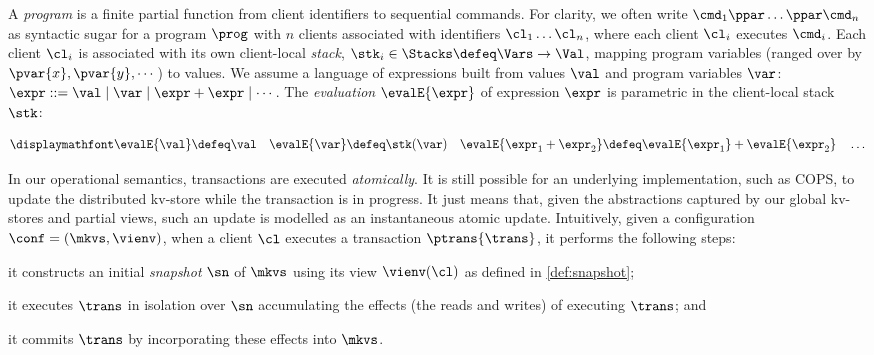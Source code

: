 A {\em program} is a finite partial function from client identifiers to sequential
commands.
For clarity, we often write \( \cmd_{1}\ppar \dots \ppar \cmd_{n}\) as syntactic sugar 
for a program \( \prog \) with $n$ clients associated with identifiers
$\cl_1 \dots \cl_n$, where each client $\cl_i$ executes
$\cmd_i$. 
Each client $\cl_i$ is associated with its own client-local  \emph{stack}, 
$\stk_i \in \Stacks \defeq \Vars \to \Val$,  mapping program variables
(ranged over by $\pvar{x}, \pvar{y}, \cdots$)
to values. 
We assume a language of expressions built from values \( \val \)
and program variables \( \var \):
$\expr ::= \val \mid \var \mid \expr + \expr \mid \cdots$.
The \emph{evaluation} $\evalE{\expr}$ of expression $\expr$ is parametric in
the client-local stack \( \stk \):%

\vspace{-5pt}
{%
\[
\displaymathfont
\begin{gathered}
\evalE{\val} \defeq
\val
\quad
\evalE{\var} \defeq
\stk(\var)
\quad
\evalE{\expr_{1} + \expr_{2}} \defeq
\evalE{\expr_{1}} + \evalE{\expr_{2}}
\quad
\dots
\end{gathered}%
\]
}%

   In our operational semantics, transactions are executed
\emph{atomically}. It is still possible for an underlying
implementation, such as COPS, to update the distributed kv-store while
the transaction is in progress. It just means that, given the
abstractions captured by our global kv-stores and partial views, 
such an update is modelled as  an instantaneous  atomic
update.
Intuitively, given a configuration $\conf = (\mkvs, \vienv)$, 
when a client $\cl$ executes a transaction $\ptrans{\trans}$, 
it performs the following steps: 
\begin{enumerate*}
	\item it constructs an initial \emph{snapshot} $\sn$ of $\mkvs$ using its view $\vienv(\cl)$ as defined in \cref{def:snapshot};  
	\item it executes $\trans$ in isolation over $\sn$
        accumulating the effects (the reads and writes) of executing $\trans$; and
	\item it commits $\trans$ by incorporating these effects into $\mkvs$.
\end{enumerate*}

